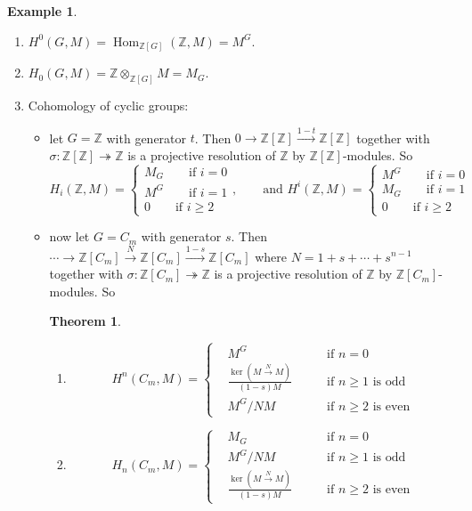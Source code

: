 \documentclass{article}
\newcommand{\Z}{\mathbb{Z}}
\newcommand{\Hom}{\operatorname{Hom}}
\theoremstyle{definition}
\newtheorem{thm}[defn]{Theorem}
\newtheorem{example}[defn]{Example}
\begin{document}
\begin{example}
\label{example:grpcohomo}
\begin{enumerate}
\item $H^0(G,M)=\Hom_{\Z[G]}(\Z,M)=M^G$.
\item $H_0(G,M)=\Z\otimes_{\Z[G]}M=M_G$.
\item Cohomology of cyclic groups: \begin{itemize}
\item let $G=\Z$ with generator $t$. Then $0\rightarrow\Z[\Z]\xrightarrow{1-t}\Z[\Z]$ together with $\sigma:\Z[\Z]\twoheadrightarrow\Z$ is a projective resolution of $\Z$ by $\Z[\Z]$-modules. So
\[
H_i(\Z,M)=\left\{
\begin{aligned}
M_G \qquad\text{if }i=0 \\
M^G \qquad\text{if }i=1 \\
0 \qquad\text{if }i\geq 2
\end{aligned}
\right. ,\qquad \text{and } H^i(\Z,M)=\left\{
\begin{aligned}
M^G \qquad\text{if }i=0 \\
M_G \qquad\text{if }i=1 \\
0 \qquad\text{if }i\geq 2
\end{aligned}
\right.
\]
\item now let $G=C_m$ with generator $s$. Then $\cdots\rightarrow\Z[C_m]\xrightarrow{N}\Z[C_m]\xrightarrow{1-s}\Z[C_m]$ where $N=1+s+\cdots+s^{n-1}$ together with $\sigma:\Z[C_m]\twoheadrightarrow\Z$ is a projective resolution of $\Z$ by $\Z[C_m]$-modules. So
\begin{thm}
\begin{enumerate}
\item
\[
H^n(C_m,M)=\left\{
\begin{aligned}
&M^G \qquad &\text{if }n=0\\
&\frac{\ker(M\xrightarrow{N}M)}{(1-s)M} \qquad &\text{if }n\geq 1\text{ is odd} \\
& M^G/NM\qquad&\text{if }n\geq 2\text{ is even}
\end{aligned}
\right.
\]
\item
\[
H_n(C_m,M)=\left\{
\begin{aligned}
&M_G \qquad &\text{if }n=0\\
&M^G/NM \qquad &\text{if }n\geq 1\text{ is odd} \\
& \frac{\ker(M\xrightarrow{N}M)}{(1-s)M}\qquad&\text{if }n\geq 2\text{ is even}
\end{aligned}
\right.
\]
\end{enumerate}
\end{thm}
\end{itemize}
\end{enumerate}
\end{example}
\end{document}
